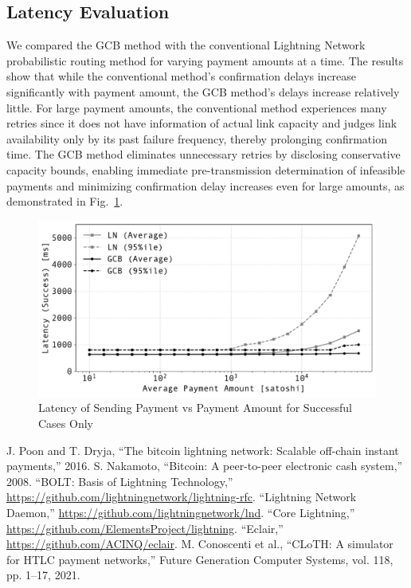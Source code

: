 \documentclass[conference]{IEEEtran}
\begin{document}
\subsection{Latency Evaluation}

We compared the GCB method with the conventional Lightning Network probabilistic routing method for varying payment amounts at a time.
The results show that while the conventional method's confirmation delays increase significantly with payment amount, the GCB method's delays increase relatively little.
For large payment amounts, the conventional method experiences many retries since it does not have information of actual link capacity and judges link availability only by its past failure frequency, thereby prolonging confirmation time.
The GCB method eliminates unnecessary retries by disclosing conservative capacity bounds, enabling immediate pre-transmission determination of infeasible payments and minimizing confirmation delay increases even for large amounts, as demonstrated in Fig.~\ref{fig:pmt_amt_vs_time}.

\begin{figure}[htbp]
	\centerline{\includegraphics[width=\linewidth]{fig/pmt_amt_vs_time}}
	\caption{Latency of Sending Payment vs Payment Amount for Successful Cases Only}
	\label{fig:pmt_amt_vs_time}
\end{figure}

\begin{thebibliography}{00}
	 J. Poon and T. Dryja, ``The bitcoin lightning network: Scalable off-chain instant payments,'' 2016.
	 S. Nakamoto, ``Bitcoin: A peer-to-peer electronic cash system,'' 2008.
	 ``BOLT: Basis of Lightning Technology,'' \url{https://github.com/lightningnetwork/lightning-rfc}.
	 ``Lightning Network Daemon,'' \url{https://github.com/lightningnetwork/lnd}.
	 ``Core Lightning,'' \url{https://github.com/ElementsProject/lightning}.
	 ``Eclair,'' \url{https://github.com/ACINQ/eclair}.
	 M. Conoscenti et al., ``CLoTH: A simulator for HTLC payment networks,'' Future Generation Computer Systems, vol. 118, pp. 1--17, 2021.
\end{thebibliography}
\end{document}
